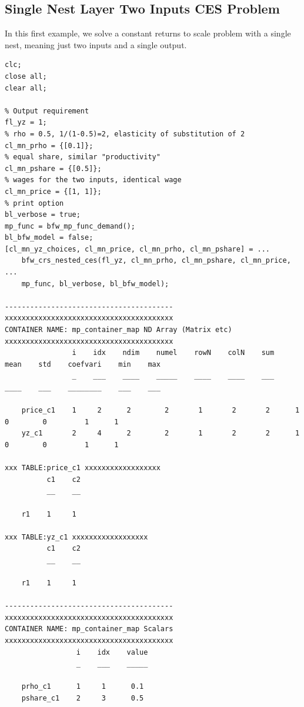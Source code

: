 \documentclass[
]{book}
\begin{document}
\hypertarget{single-nest-layer-two-inputs-ces-problem}{%
\subsection{Single Nest Layer Two Inputs CES Problem}\label{single-nest-layer-two-inputs-ces-problem}}

In this first example, we solve a constant returns to scale problem with
a single nest, meaning just two inputs and a single output.

\begin{verbatim}
clc;
close all;
clear all;

% Output requirement
fl_yz = 1;
% rho = 0.5, 1/(1-0.5)=2, elasticity of substitution of 2
cl_mn_prho = {[0.1]};
% equal share, similar "productivity"
cl_mn_pshare = {[0.5]};
% wages for the two inputs, identical wage
cl_mn_price = {[1, 1]};
% print option
bl_verbose = true;
mp_func = bfw_mp_func_demand();
bl_bfw_model = false;
[cl_mn_yz_choices, cl_mn_price, cl_mn_prho, cl_mn_pshare] = ...
    bfw_crs_nested_ces(fl_yz, cl_mn_prho, cl_mn_pshare, cl_mn_price, ...
    mp_func, bl_verbose, bl_bfw_model);

----------------------------------------
xxxxxxxxxxxxxxxxxxxxxxxxxxxxxxxxxxxxxxxx
CONTAINER NAME: mp_container_map ND Array (Matrix etc)
xxxxxxxxxxxxxxxxxxxxxxxxxxxxxxxxxxxxxxxx
                i    idx    ndim    numel    rowN    colN    sum    mean    std    coefvari    min    max
                _    ___    ____    _____    ____    ____    ___    ____    ___    ________    ___    ___

    price_c1    1     2      2        2       1       2       2      1       0        0         1      1 
    yz_c1       2     4      2        2       1       2       2      1       0        0         1      1 

xxx TABLE:price_c1 xxxxxxxxxxxxxxxxxx
          c1    c2
          __    __

    r1    1     1 

xxx TABLE:yz_c1 xxxxxxxxxxxxxxxxxx
          c1    c2
          __    __

    r1    1     1 

----------------------------------------
xxxxxxxxxxxxxxxxxxxxxxxxxxxxxxxxxxxxxxxx
CONTAINER NAME: mp_container_map Scalars
xxxxxxxxxxxxxxxxxxxxxxxxxxxxxxxxxxxxxxxx
                 i    idx    value
                 _    ___    _____

    prho_c1      1     1      0.1 
    pshare_c1    2     3      0.5 
\end{verbatim}
\end{document}
